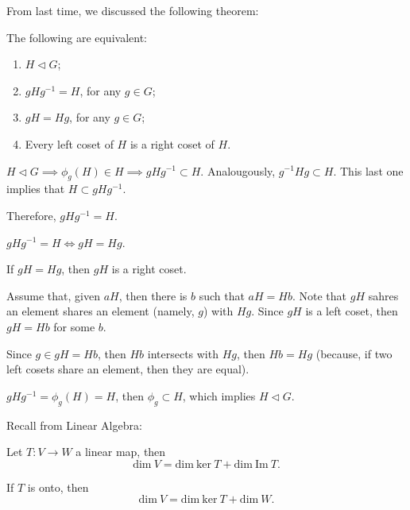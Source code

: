 
From last time, we discussed the following theorem:

\begin{thm} The following are equivalent:
	\begin{enumerate}
		\item $H \vartriangleleft G$;
		\item $gHg^{-1} = H$, for any $g \in G$;
		\item $gH = Hg$, for any  $g \in G$;
		\item Every left coset of $H$ is a right coset of $H$.
	\end{enumerate}
\end{thm}

\begin{dem}[$i$ $\implies$ $ii$]
	$H \vartriangleleft G \implies \phi_g(H) \in H \implies gHg^{-1} \subset H$.
	Analougously, $g^{-1}Hg \subset H$. This last one implies that $H \subset gHg^{-1}$.

	Therefore,  $gHg^{-1} = H$.
\end{dem}

\begin{dem}
	$gHg^{-1} = H \iff gH = Hg$.
\end{dem}

\begin{dem}
	If $gH = Hg$, then  $gH$ is a right coset.
\end{dem}

\begin{dem}
	Assume that, given $aH$, then there is $b$ such that $aH = Hb$. Note that $gH$ sahres an element shares an element (namely, $g$) with $Hg$.
	Since $gH$ is a left coset, then  $gH = Hb$ for some $b$.

	Since $g \in gH = Hb$, then $Hb$ intersects with $Hg$, then $Hb = Hg$ (because, if two left cosets share an element, then they are equal).
\end{dem}

\begin{dem}[$ii \implies i$]
	$gHg^{-1} = \phi_g(H) = H$, then $\phi_g \subset H$, which implies $H \vartriangleleft G$.
\end{dem}

Recall from Linear Algebra:

\begin{thm}
	Let $T: V \to W$ a linear map, then
	\[\mathrm{dim}\ V = \mathrm{dim}\ \mathrm{ker}\ T + \mathrm{dim}\ \mathrm{Im}\ T.\]

	If $T$ is onto, then	
	\[\mathrm{dim}\ V = \mathrm{dim}\ \mathrm{ker}\ T + \mathrm{dim}\ W.\]
\end{thm}

